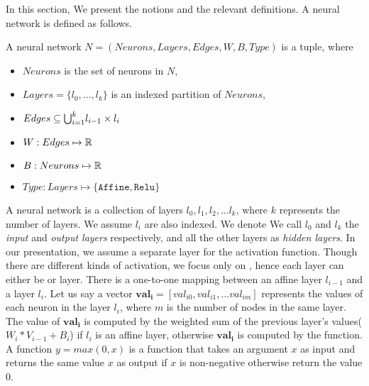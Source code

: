 In this section, We present the notions and the relevant definitions.
A neural network is defined as follows. %

\begin{df}
    \label{def:net}
    A neural network $N = (Neurons, Layers, Edges, W, B, Type)$ is a tuple, where
    \begin{itemize}
        \item $Neurons$ is the set of neurons in $N$,
        \item $Layers = \{l_0,...,l_k\}$ is an indexed partition of $Neurons$,
        \item $ Edges \subseteq {\bigcup}_{i=1}^{k} l_{i-1} \times l_{i}$
        \item $W : Edges \mapsto \mathbb{R}$
        \item $B : Neurons \mapsto \mathbb{R}$
        \item $Type : Layers \mapsto \{\mathtt{Affine}, \mathtt{Relu}\}$
    \end{itemize}
\end{df}

A neural network is a collection of layers $l_0, l_1, l_2, ... l_k$, where $k$ represents
the number of layers.
We assume $l_i$ are also indexed. We denote
We call $l_0$ and $l_k$ the {\em input} and {\em output layers} respectively, and all
the other layers as {\em hidden layers}.
%
In our presentation, we assume a separate layer for the activation function.
%
Though there are different kinds of
activation, we focus only on \relu{}, hence each layer can either be  \affine{} or \relu{} layer.
There is a one-to-one mapping between an affine layer $l_{i-1}$ and a \relu{} layer $l_i$. 
Let us say a vector $\boldsymbol{val_i} = [val_{i0}, val_{i1}, ... val_{im}]$ represents the values of each neuron 
in the layer $l_i$, where $m$ is the number of nodes in the same layer.
The value of $\boldsymbol{val_i}$ is computed by the weighted sum of the previous layer's values($W_i * V_{i-1} + B_i$)
if $l_i$ is an affine layer, otherwise $\boldsymbol{val_i}$ is computed by the \relu{} function. 
A function $y = max(0,x)$ is a \relu{} function that takes an argument $x$ as input and returns the
same value $x$ as output if $x$ is non-negative otherwise return the value 0. 


